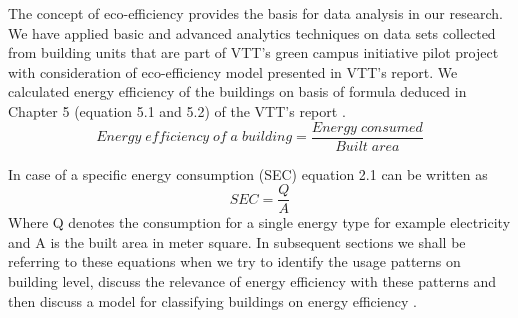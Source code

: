 The concept of eco-efficiency provides the basis for data analysis in our research. We have applied basic and advanced analytics techniques on data sets collected from building units that are part of VTT's green campus initiative pilot project with consideration of eco-efficiency model presented in VTT's report. We calculated energy efficiency of  the buildings on basis of formula deduced in Chapter 5 (equation 5.1 and 5.2) of the VTT's  report \cite{forsstrommeasuring}.
\begin{equation}
Energy\;efficiency\;of\;a\;building  =  \frac{Energy\;consumed}{Built\;area}
\end{equation}  

In case of a specific energy consumption (SEC) \cite{forsstrommeasuring} equation 2.1 can be written as 
\begin{equation} \label{spec_energy}
SEC  = \frac{Q}{A}
\end{equation} 
Where Q denotes the consumption for a single energy type for example electricity and A is the built area in meter square. In subsequent sections we shall be  referring to these equations when we try to identify the usage patterns on building level, discuss the relevance of  energy efficiency with these patterns and then discuss a model for classifying buildings on energy efficiency .

